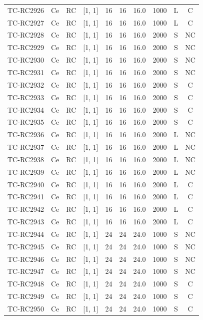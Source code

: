 \begin{longtable}{lccccccccc}
TC-RC2926 & Ce & RC & [1, 1] & 16 & 16 & 16.0 & 1000 & L & C \\
TC-RC2927 & Ce & RC & [1, 1] & 16 & 16 & 16.0 & 1000 & L & C \\
TC-RC2928 & Ce & RC & [1, 1] & 16 & 16 & 16.0 & 2000 & S & NC \\
TC-RC2929 & Ce & RC & [1, 1] & 16 & 16 & 16.0 & 2000 & S & NC \\
TC-RC2930 & Ce & RC & [1, 1] & 16 & 16 & 16.0 & 2000 & S & NC \\
TC-RC2931 & Ce & RC & [1, 1] & 16 & 16 & 16.0 & 2000 & S & NC \\
TC-RC2932 & Ce & RC & [1, 1] & 16 & 16 & 16.0 & 2000 & S & C \\
TC-RC2933 & Ce & RC & [1, 1] & 16 & 16 & 16.0 & 2000 & S & C \\
TC-RC2934 & Ce & RC & [1, 1] & 16 & 16 & 16.0 & 2000 & S & C \\
TC-RC2935 & Ce & RC & [1, 1] & 16 & 16 & 16.0 & 2000 & S & C \\
TC-RC2936 & Ce & RC & [1, 1] & 16 & 16 & 16.0 & 2000 & L & NC \\
TC-RC2937 & Ce & RC & [1, 1] & 16 & 16 & 16.0 & 2000 & L & NC \\
TC-RC2938 & Ce & RC & [1, 1] & 16 & 16 & 16.0 & 2000 & L & NC \\
TC-RC2939 & Ce & RC & [1, 1] & 16 & 16 & 16.0 & 2000 & L & NC \\
TC-RC2940 & Ce & RC & [1, 1] & 16 & 16 & 16.0 & 2000 & L & C \\
TC-RC2941 & Ce & RC & [1, 1] & 16 & 16 & 16.0 & 2000 & L & C \\
TC-RC2942 & Ce & RC & [1, 1] & 16 & 16 & 16.0 & 2000 & L & C \\
TC-RC2943 & Ce & RC & [1, 1] & 16 & 16 & 16.0 & 2000 & L & C \\
TC-RC2944 & Ce & RC & [1, 1] & 24 & 24 & 24.0 & 1000 & S & NC \\
TC-RC2945 & Ce & RC & [1, 1] & 24 & 24 & 24.0 & 1000 & S & NC \\
TC-RC2946 & Ce & RC & [1, 1] & 24 & 24 & 24.0 & 1000 & S & NC \\
TC-RC2947 & Ce & RC & [1, 1] & 24 & 24 & 24.0 & 1000 & S & NC \\
TC-RC2948 & Ce & RC & [1, 1] & 24 & 24 & 24.0 & 1000 & S & C \\
TC-RC2949 & Ce & RC & [1, 1] & 24 & 24 & 24.0 & 1000 & S & C \\
TC-RC2950 & Ce & RC & [1, 1] & 24 & 24 & 24.0 & 1000 & S & C \\

\end{longtable}
